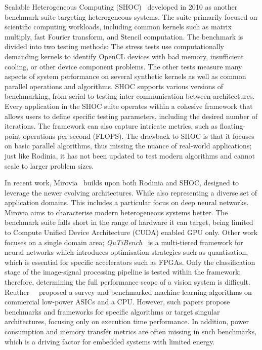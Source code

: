Scalable Heterogeneous Computing (SHOC)~\cite{DanMarMcC10} developed in 2010 as another benchmark suite targeting heterogeneous systems. The suite primarily focused on scientific computing workloads, including common kernels such as matrix multiply, fast Fourier transform, and Stencil computation. The benchmark is divided into two testing methods: The stress tests use computationally demanding kernels to identify OpenCL devices with bad memory, insuﬃcient cooling, or other device component problems. The other tests measure many
aspects of system performance on several synthetic kernels as well as common parallel operations and algorithms. SHOC supports various versions of benchmarking, from serial to testing inter-communication between architectures. Every application in the SHOC suite operates within a cohesive framework that allows users to define specific testing parameters, including the desired number of iterations. The framework can also capture intricate metrics, such as floating-point operations per second (FLOPS). The drawback to SHOC is that it focuses on basic parallel algorithms, thus missing the nuance of real-world applications; just like Rodinia, it has not been updated to test modern algorithms and cannot scale to larger problem sizes.

In recent work, Mirovia~\cite{Hu2019MiroviaAB} builds upon both Rodinia and SHOC, designed to leverage the newer evolving architectures. While also representing a diverse set of application domains. This includes a particular focus on deep neural networks. Mirovia aims to characterise modern heterogeneous systems better. The benchmark suite falls short in the range of hardware it can target, being limited to Compute Unified Device Architecture (CUDA) enabled GPU only. Other work focuses on a single domain area; \textit{QuTiBench}~\cite{BloHalLis} is a multi-tiered framework for neural networks which introduces optimisation strategies such as quantisation, which is essential for specific accelerators such as FPGAs. Only the classification stage of the image-signal processing pipeline is tested within the framework; therefore, determining the full performance scope of a vision system is difficult. Reuther~\etal~\cite{ReuAlbMich19} proposed a survey and benchmarked machine learning algorithms on commercial low-power ASICs and a CPU. However, such papers propose benchmarks and frameworks for specific algorithms or target singular architectures, focusing only on execution time performance. In addition, power consumption and memory transfer metrics are often missing in such benchmarks, which is a driving factor for embedded systems with limited energy.


